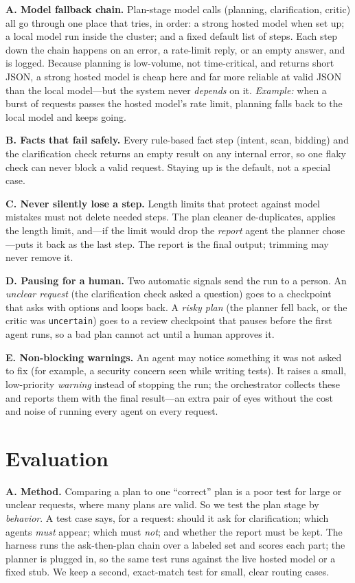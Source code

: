\documentclass[conference]{IEEEtran}
\begin{document}
\textbf{A. Model fallback chain.} Plan-stage model calls (planning, clarification,
critic) all go through one place that tries, in order: a strong hosted model when
set up; a local model run inside the cluster; and a fixed default list of steps.
Each step down the chain happens on an error, a rate-limit reply, or an empty
answer, and is logged. Because planning is low-volume, not time-critical, and
returns short JSON, a strong hosted model is cheap here and far more reliable at
valid JSON than the local model---but the system never \emph{depends} on it.
\emph{Example:} when a burst of requests passes the hosted model's rate limit,
planning falls back to the local model and keeps going.

\textbf{B. Facts that fail safely.} Every rule-based fact step (intent, scan,
bidding) and the clarification check returns an empty result on any internal error,
so one flaky check can never block a valid request. Staying up is the default, not a
special case.

\textbf{C. Never silently lose a step.} Length limits that protect against model
mistakes must not delete needed steps. The plan cleaner de-duplicates, applies the
length limit, and---if the limit would drop the \emph{report} agent the planner
chose---puts it back as the last step. The report is the final output; trimming may
never remove it.

\textbf{D. Pausing for a human.} Two automatic signals send the run to a person. An
\emph{unclear request} (the clarification check asked a question) goes to a
checkpoint that asks with options and loops back. A \emph{risky plan} (the planner
fell back, or the critic was \texttt{uncertain}) goes to a review checkpoint that
pauses before the first agent runs, so a bad plan cannot act until a human approves
it.

\textbf{E. Non-blocking warnings.} An agent may notice something it was not asked to
fix (for example, a security concern seen while writing tests). It raises a small,
low-priority \emph{warning} instead of stopping the run; the orchestrator collects
these and reports them with the final result---an extra pair of eyes without the
cost and noise of running every agent on every request.

\section{Evaluation}
\label{sec:eval}
\textbf{A. Method.} Comparing a plan to one ``correct'' plan is a poor test for
large or unclear requests, where many plans are valid. So we test the plan stage by
\emph{behavior}. A test case says, for a request: should it ask for clarification;
which agents \emph{must} appear; which must \emph{not}; and whether the report must
be kept. The harness runs the ask-then-plan chain over a labeled set and scores each
part; the planner is plugged in, so the same test runs against the live hosted model
or a fixed stub. We keep a second, exact-match test for small, clear routing cases.
\end{document}
